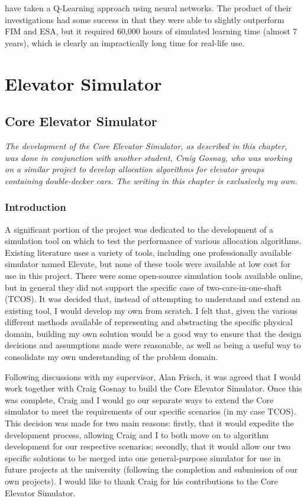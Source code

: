 \documentclass{UoYCSproject}
\begin{document}
\citet{Crites1998} have taken a Q-Learning approach using neural networks.  The product of their investigations had some success in that they were able to slightly outperform FIM and ESA, but it required 60,000 hours of simulated learning time (almost 7 years), which is clearly an impractically long time for real-life use.

\part{Elevator Simulator}

\chapter{Core Elevator Simulator}
\label{ceschapter}

\textit{The development of the Core Elevator Simulator, as described in this chapter, was done in conjunction with another student, Craig Gosnay, who was working on a similar project to develop allocation algorithms for elevator groups containing double-decker cars.  The writing in this chapter is exclusively my own.}

\section{Introduction}

A significant portion of the project was dedicated to the development of a simulation tool on which to test the performance of various allocation algorithms.  Existing literature uses a variety of tools, including one professionally available simulator named Elevate, but none of these tools were available at low cost for use in this project.  There were some open-source simulation tools available online, but in general they did not support the specific case of two-cars-in-one-shaft (TCOS).  It was decided that, instead of attempting to understand and extend an existing tool, I would develop my own from scratch.  I felt that, given the various different methods available of representing and abstracting the specific physical domain, building my own solution would be a good way to ensure that the design decisions and assumptions made were reasonable, as well as being a useful way to consolidate my own understanding of the problem domain.

Following discussions with my supervisor, Alan Frisch, it was agreed that I would work together with Craig Gosnay to build the Core Elevator Simulator.  Once this was complete, Craig and I would go our separate ways to extend the Core simulator to meet the requirements of our specific scenarios (in my case TCOS).  This decision was made for two main reasons: firstly, that it would expedite the development process, allowing Craig and I to both move on to algorithm development for our respective scenarios; secondly, that it would allow our two specific solutions to be merged into one general-purpose simulator for use in future projects at the university (following the completion and submission of our own projects).  I would like to thank Craig for his contributions to the Core Elevator Simulator.
\end{document}
